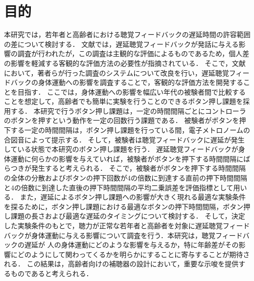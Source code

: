 \section{目的}
本研究では，若年者と高齢者における聴覚フィードバックの遅延時間の許容範囲の差について検討する．
文献\cite{kayama}では，遅延聴覚フィードバックが発話に与える影響の調査が行われたが，この調査は主観的な評価によるものであるため，個人差の影響を軽減する客観的な評価方法の必要性が指摘されている．
そこで，文献\cite{shigematu}において，著者らが行った調査のシステムについて改良を行い，遅延聴覚フィードバックの身体運動への影響を調査することで，客観的な評価方法を開発することを目指す．
ここでは，身体運動への影響を幅広い年代の被験者間で比較することを想定して，高齢者でも簡単に実験を行うことのできるボタン押し課題を採用する．
本研究で行うボタン押し課題は，一定の時間間隔ごとにコントローラのボタンを押すという動作を一定の回数行う課題である．
被験者がボタンを押下する一定の時間間隔は，ボタン押し課題を行っている間，電子メトロノームの合図音によって提示する．
そして，被験者は聴覚フィードバックに遅延が発生している状態で本研究のボタン押し課題を行う．
遅延聴覚フィードバックが身体運動に何らかの影響を与えていれば，被験者がボタンを押下する時間間隔にばらつきが発生すると考えられる．
そこで，被験者がボタンを押下する時間間隔の全体の分散およびボタンの押下回数が4の倍数に到達する直前の押下時間間隔と4の倍数に到達した直後の押下時間間隔の平均二乗誤差を評価指標として用いる．
また，遅延によるボタン押し課題への影響が大きく現れる最適な実験条件を探るために，ボタン押し課題における最適なボタンの押下時間間隔，ボタン押し課題の長さおよび最適な遅延のタイミングについて検討する．
そして，決定した実験条件のもとで，聴力が正常な若年者と高齢者を対象に遅延聴覚フィードバックが身体運動に与える影響について調査を行う．本研究は，聴覚フィードバックの遅延が
人の身体運動にどのような影響を与えるか，特に年齢差がその影響にどのようにして関わってくるかを明らかにすることに寄与することが期待される．
この結果は，高齢者向けの補聴器の設計において，重要な示唆を提供するものであると考えられる．
\newpage


